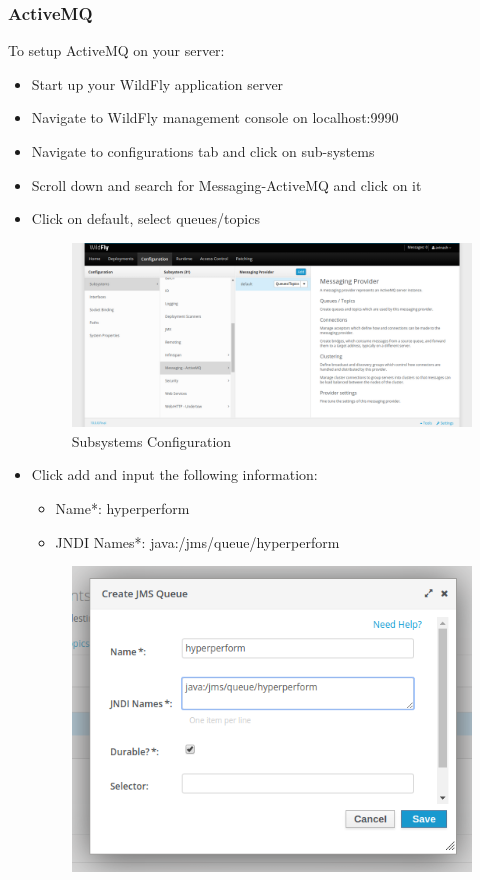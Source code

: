 \documentclass[11pt,a4paper]{article}
\begin{document}
\subsubsection{ActiveMQ}
To setup ActiveMQ on your server: \\
\begin{itemize}
	\item Start up your WildFly application server
	\item Navigate to WildFly management console on localhost:9990
	\item Navigate to configurations tab and click on sub-systems
	\item Scroll down and search for Messaging-ActiveMQ and click on it
	\item Click on default, select queues/topics
		\begin{figure}[H]
		\begin{center}
			\includegraphics[width=\linewidth]{../Images/defaultqueue}
			\caption{Subsystems Configuration}
		\end{center}
	\end{figure}
	\item Click add and input the following information:
		\begin{itemize}
			\item Name*: hyperperform
			\item JNDI Names*: java:/jms/queue/hyperperform
		\end{itemize}
			\begin{figure}[H]
		\begin{center}
			\includegraphics[scale=0.4]{../Images/queueconf}

\end{center}
\end{figure}
\end{itemize}
\end{document}

